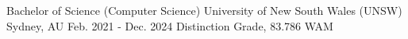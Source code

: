 

\begin{cventries}

  \cventry
    {Bachelor of Science (Computer Science)} %
    {University of New South Wales (UNSW)} %
    {Sydney, AU} %
    {Feb. 2021 - Dec. 2024} %
    {Distinction Grade, 83.786 WAM}

\end{cventries}
